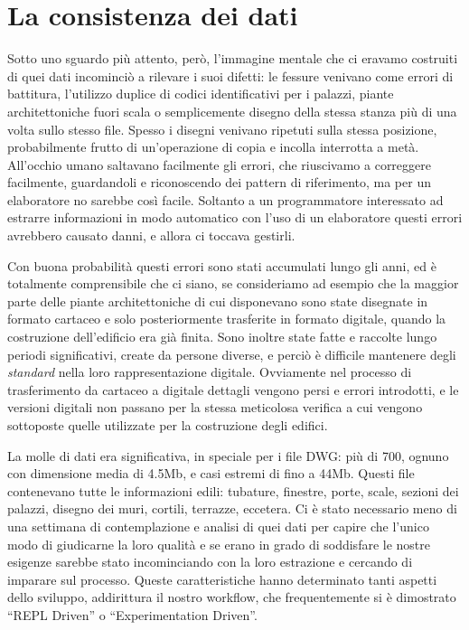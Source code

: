 \documentclass[12pt]{report}
\begin{document}
\section{La consistenza dei dati}

Sotto uno sguardo più attento, però, l'immagine mentale che ci eravamo costruiti di quei dati incominciò a rilevare i suoi difetti: le fessure venivano come errori di battitura, l'utilizzo duplice di codici identificativi per i palazzi, piante architettoniche fuori scala o semplicemente disegno della stessa stanza più di una volta sullo stesso file. Spesso i disegni venivano ripetuti sulla stessa posizione, probabilmente frutto di un'operazione di copia e incolla interrotta a metà. All'occhio umano saltavano facilmente gli errori, che riuscivamo a correggere facilmente, guardandoli e riconoscendo dei pattern di riferimento, ma per un elaboratore no sarebbe così facile. Soltanto a un programmatore interessato ad estrarre informazioni in modo automatico con l'uso di un elaboratore questi errori avrebbero causato danni, e allora ci toccava gestirli.

Con buona probabilità questi errori sono stati accumulati lungo gli anni, ed è totalmente comprensibile che ci siano, se  consideriamo ad esempio che la maggior parte delle piante architettoniche di cui disponevano sono state disegnate in formato cartaceo e solo posteriormente trasferite in formato digitale, quando la costruzione dell'edificio era già finita. Sono inoltre state fatte e raccolte lungo periodi significativi, create da persone diverse, e perciò è difficile mantenere degli \textit{standard} nella loro rappresentazione digitale. Ovviamente nel processo di trasferimento da cartaceo a digitale dettagli vengono persi e errori introdotti, e le versioni digitali non passano per la stessa meticolosa verifica a cui vengono sottoposte quelle utilizzate per la costruzione degli edifici. 

La molle di dati era significativa, in speciale per i file DWG: più di 700, ognuno con dimensione media di 4.5Mb, e casi estremi di fino a 44Mb. Questi file contenevano tutte le informazioni edili: tubature, finestre, porte, scale, sezioni dei palazzi, disegno dei muri, cortili, terrazze, eccetera. Ci è stato necessario meno di una settimana di contemplazione e analisi di quei dati per capire che l'unico modo di giudicarne la loro qualità e se erano in grado di soddisfare le nostre esigenze sarebbe stato incominciando con la loro estrazione e cercando di imparare sul processo. Queste caratteristiche hanno determinato tanti aspetti dello sviluppo, addirittura il nostro workflow, che frequentemente si è dimostrato ``REPL Driven'' o ``Experimentation Driven''.
\end{document}

